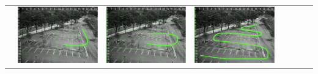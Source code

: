 \begin{landscape}
\begin{table}[]
{\begin{tabular}{|l||l|l|l|l|l|l|l|}
 & \includegraphics[scale=0.25]{image/suppResults/q4.PNG}
 & \includegraphics[scale=0.25]{image/suppResults/q5.PNG}
 & \includegraphics[scale=0.25]{image/suppResults/q6.PNG}

\end{tabular}}
\end{table}
\end{landscape}
